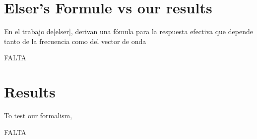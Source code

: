\documentclass{iopart}
\newcommand{\sinc}{sinc}
\begin{document}

\section{Elser's Formule vs our results}
En el trabajo de[elser], derivan una fómula para la respuesta efectiva
que depende tanto de la frecuencia como del vector de onda 

FALTA





\section{Results}
\label{Numeric}

To test our formalism, 

FALTA
\end{document}
